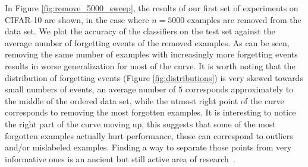 


In Figure \ref{fig:remove_5000_sweep}, the results of our first set of experiments on CIFAR-10 are shown, in the case where $n = 5000$ examples are removed from the data set. We plot the accuracy of the classifiers on the test set against the average number of forgetting events of the removed examples. As can be seen, removing the same number of examples with increasingly more forgetting events results in worse generalization for most of the curve. It is worth noting that the distribution of forgetting events (Figure \ref{fig:distributions}) is very skewed towards small numbers of events, an average number of $5$ corresponds approximately to the middle of the ordered data set, while the utmost right point of the curve corresponds to removing the most forgotten examples. It is interesting to notice the right part of the curve moving up, this suggests that some of the most forgotten examples actually hurt performance, those can correspond to outliers and/or mislabeled examples. Finding a way to separate those points from very informative ones is an ancient but still active area of research~\citep{john1995robust,jiang18mentor}.


